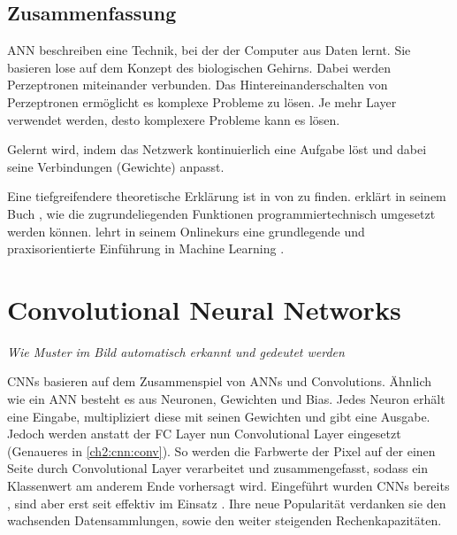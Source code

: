 \subsection*{Zusammenfassung}
\ac{ANN} beschreiben eine Technik, bei der der Computer aus Daten lernt.
Sie basieren lose auf dem Konzept des biologischen Gehirns.
Dabei werden Perzeptronen miteinander verbunden.
Das Hintereinanderschalten von Perzeptronen ermöglicht es komplexe Probleme zu lösen.
Je mehr Layer verwendet werden, desto komplexere Probleme kann es lösen.

Gelernt wird, indem das Netzwerk kontinuierlich eine Aufgabe löst und dabei seine Verbindungen (Gewichte) anpasst.

\bigskip
Eine tiefgreifendere theoretische Erklärung ist in  von \citeauthor{goodfellow_deep_2016} zu finden.
\citeauthor{nielsen_neural_2018} erklärt in seinem Buch , wie die zugrundeliegenden Funktionen programmiertechnisch umgesetzt werden können.
\citeauthor{ng_maschinelles_nodate} lehrt in seinem Onlinekurs eine grundlegende und praxisorientierte Einführung in Machine Learning \cite{ng_maschinelles_nodate}.


\section{Convolutional Neural Networks} \label{ch2:cnn}

\begin{center}
    \textit{Wie Muster im Bild automatisch erkannt und gedeutet werden}
\end{center}

\acp{CNN} basieren auf dem Zusammenspiel von \acp{ANN} und Convolutions. 
Ähnlich wie ein \ac{ANN} besteht es aus Neuronen, Gewichten und Bias.
Jedes Neuron erhält eine Eingabe, multipliziert diese mit seinen Gewichten und gibt eine Ausgabe.
Jedoch werden anstatt der \ac{FC} Layer nun Convolutional Layer eingesetzt (Genaueres in \autoref{ch2:cnn:conv}).
So werden die Farbwerte der Pixel auf der einen Seite durch Convolutional Layer verarbeitet und zusammengefasst, sodass ein Klassenwert am anderem Ende vorhersagt wird.
Eingeführt wurden \acp{CNN} bereits \citeyear{lecun_gradient-based_1998}, sind aber erst seit \citeyear{krizhevsky_imagenet_2012} effektiv im Einsatz \cite{lecun_gradient-based_1998,krizhevsky_imagenet_2012,russakovsky_imagenet_2015}.
Ihre neue Popularität verdanken sie den wachsenden Datensammlungen, sowie den weiter steigenden Rechenkapazitäten.

